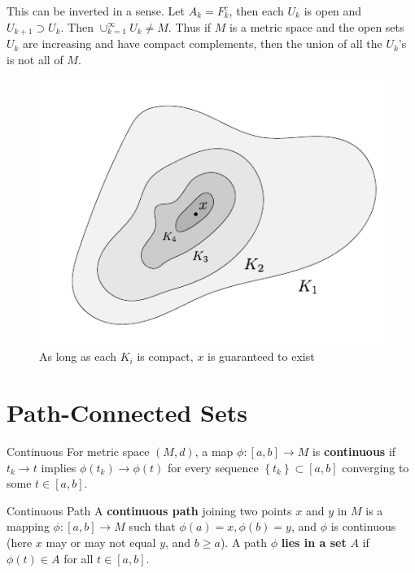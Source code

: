 \documentclass[10pt]{report}
\begin{document}
This can be inverted in a sense. Let $A_k = F_k^c$, then each $U_k$ is open and $U_{k+1} \supset U_k$. Then $\cup_{k=1}^\infty U_k \neq M$. Thus if $M$ is a metric space and the open sets $U_k$ are increasing and have compact complements, then the union of all the $U_k$'s is not all of $M$. 

\begin{figure}[H]
	\centering
	\includegraphics[scale=1]{fig/nested-set.pdf}
	\caption{As long as each $K_i$ is compact, $x$ is guaranteed to exist}
\end{figure}




\section{Path-Connected Sets}
\begin{defn}{Continuous}{}
	For metric space  $(M,d)$, a map $\phi:[a,b]\to M$ is \textbf{continuous} if $t_k \to t$ implies $\phi(t_k) \to \phi(t)$ for every sequence $\left\{ t_k \right\} \subset [a,b]$ converging to some $t \in [a,b]$.
\end{defn}

\begin{defn}{Continuous Path}{}
	A \textbf{continuous path} joining two points $x $ and $y$ in $M$ is a mapping $\phi:[a,b] \to M$ such that $\phi(a)=x, \phi(b)=y$, and $\phi$ is continuous (here $x$ may or may not equal $y$, and $b \geq a$). A path $\phi$ \textbf{lies in a set} $A$ if $\phi(t) \in A$ for all $t \in [a,b]$.
\end{defn}
\end{document}
